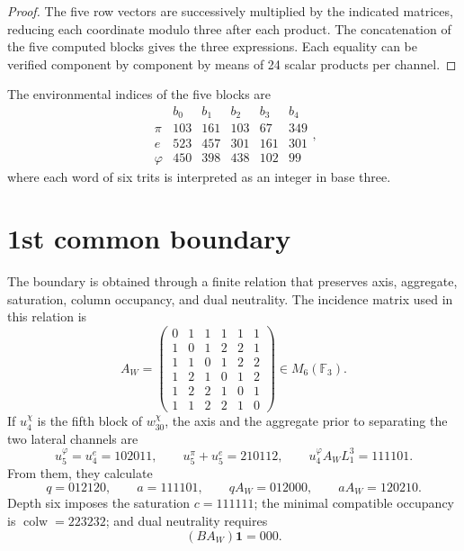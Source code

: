 \begin{proof}
The five row vectors are successively multiplied by the indicated
matrices, reducing each coordinate modulo three after each product.
The concatenation of the five computed blocks gives the three expressions.
Each equality can be verified component by component by means of 24
scalar products per channel.
\end{proof}

The environmental indices of the five blocks are
\[
\begin{array}{c|rrrrr}
&b_0&b_1&b_2&b_3&b_4\\\hline
\pi&103&161&103&67&349\\
e&523&457&301&161&301\\
\varphi&450&398&438&102&99
\end{array},
\]
where each word of six trits is interpreted as an integer in base three.

\section{1st common boundary}

The boundary is obtained through a finite relation that preserves axis, aggregate,
saturation, column occupancy, and dual neutrality. The incidence matrix
used in this relation is
\begin{equation}
 A_W=
 \begin{pmatrix}
 0&1&1&1&1&1\\
 1&0&1&2&2&1\\
 1&1&0&1&2&2\\
 1&2&1&0&1&2\\
 1&2&2&1&0&1\\
 1&1&2&2&1&0
 \end{pmatrix}\in M_6(\mathbb F_3).
 \label{eq:u008-aw-frontera}
\end{equation}
If \(u_4^\chi\) is the fifth block of \(w_{30}^\chi\), the axis and the
aggregate prior to separating the two lateral channels are
\begin{equation}
 u_5^\varphi=u_4^e=102011,
 \qquad
 u_5^\pi+u_5^e=210112,
 \qquad
 u_4^\varphi A_WL_1^3=111101.
 \label{eq:u008-eje-agregado-r36}
\end{equation}
From them, they calculate
\begin{equation}
 q=012120,\qquad a=111101,\qquad
 qA_W=012000,\qquad aA_W=120210.
 \label{eq:u008-q-a-r36}
\end{equation}
Depth six imposes the saturation \(c=111111\); the minimal compatible
occupancy is \(\operatorname{colw}=223232\); and dual neutrality requires
\begin{equation}
 (BA_W)\mathbf1=000.
 \label{eq:u008-neutralidad-dual-r36}
\end{equation}

